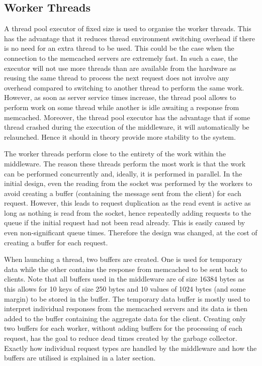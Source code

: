 \documentclass[11pt,a4paper]{article}
\begin{document}
\subsection{Worker Threads}
A thread pool executor of fixed size is used to organise the worker threads. This has the advantage that it reduces thread environment switching overhead if there is no need for an extra thread to be used. This could be the case when the connection to the memcached servers are extremely fast. In such a case, the executor will not use more threads than are available from the hardware as reusing the same thread to process the next request does not involve any overhead compared to switching to another thread to perform the same work. However, as soon as server service times increase, the thread pool allows to perform work on some thread while another is idle awaiting a response from memcached. Moreover, the thread pool executor has the advantage that if some thread crashed during the execution of the middleware, it will automatically be relaunched. Hence it should in theory provide more stability to the system.

The worker threads perform close to the entirety of the work within the middleware. The reason these threads perform the most work is that the work can be performed concurrently and, ideally, it is performed in parallel. In the initial design, even the reading from the socket was performed by the workers to avoid creating a buffer (containing the message sent from the client) for each request. However, this leads to request duplication as the read event is active as long as nothing is read from the socket, hence repeatedly adding requests to the queue if the initial request had not been read already. This is easily caused by even non-significant queue times. Therefore the design was changed, at the cost of creating a buffer for each request.

When launching a thread, two buffers are created. One is used for temporary data while the other contains the response from memcached to be sent back to clients. Note that all buffers used in the middleware are of size 16384 bytes as this allows for 10 keys of size 250 bytes and 10 values of 1024 bytes (and some margin) to be stored in the buffer. The temporary data buffer is mostly used to interpret individual responses from the memcached servers and its data is then added to the buffer containing the aggregate data for the client. Creating only two buffers for each worker, without adding buffers for the processing of each request, has the goal to reduce dead times created by the garbage collector. Exactly how individual request types are handled by the middleware and how the buffers are utilised is explained in a later section.
\end{document}
